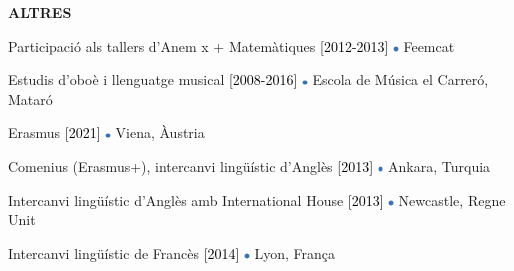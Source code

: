\documentclass[../main.tex]{subfiles}
\begin{document}
    \vspace*{0.8cm}
    \textbf{\textcolor{myCV2}{ALTRES\underline{\hspace{16.5cm}}}}
        \vspace*{0.3cm}
        
        Participació als tallers d'Anem x + Matemàtiques 
        \textcolor{black}{[2012-2013]}
        \includegraphics[width=0.15cm]{assets/full.png} 
        Feemcat

        \vspace*{0.25cm}
        Estudis d'oboè i llenguatge musical
        \textcolor{black}{[2008-2016]}
        \includegraphics[width=0.15cm]{assets/full.png} 
        Escola de Música el Carreró, Mataró

        \vspace*{0.25cm}
        Erasmus
        \textcolor{black}{[2021]}
        \includegraphics[width=0.15cm]{assets/full.png} 
        Viena, Àustria
        
        \vspace*{0.25cm}
        Comenius (Erasmus+), intercanvi lingüístic d'Anglès
        \textcolor{black}{[2013]}
        \includegraphics[width=0.15cm]{assets/full.png} 
        Ankara, Turquia

        \vspace*{0.25cm}
        Intercanvi lingüístic d'Anglès amb International House
        \textcolor{black}{[2013]}
        \includegraphics[width=0.15cm]{assets/full.png} 
        Newcastle, Regne Unit

        \vspace*{0.25cm}
        Intercanvi lingüístic de Francès
        \textcolor{black}{[2014]}
        \includegraphics[width=0.15cm]{assets/full.png} 
        Lyon, França
        
\end{document}

